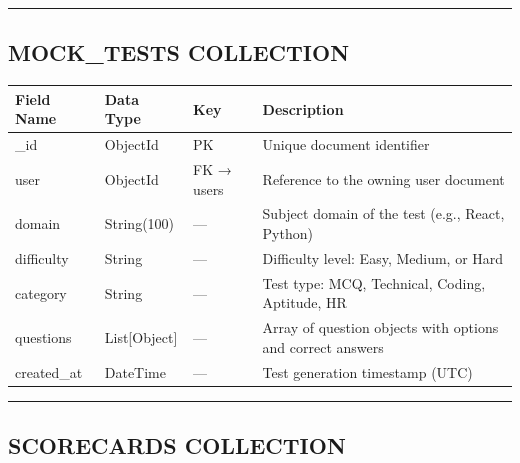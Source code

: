 \documentclass[12pt]{article}
\begin{document}
\noindent\rule{\textwidth}{0.4pt}

\subsection{MOCK\_TESTS COLLECTION}


\begin{longtable}{|p{}|p{}|p{}|p{}|}
\hline
\textbf{Field Name} & \textbf{Data Type} & \textbf{Key} & \textbf{Description} \\ \hline
\endhead
\_id & ObjectId & PK & Unique document identifier \\ \hline
user & ObjectId & FK → users & Reference to the owning user document \\ \hline
domain & String(100) & — & Subject domain of the test (e.g., React, Python) \\ \hline
difficulty & String & — & Difficulty level: Easy, Medium, or Hard \\ \hline
category & String & — & Test type: MCQ, Technical, Coding, Aptitude, HR \\ \hline
questions & List[Object] & — & Array of question objects with options and correct answers \\ \hline
created\_at & DateTime & — & Test generation timestamp (UTC) \\ \hline
\end{longtable}


\noindent\rule{\textwidth}{0.4pt}

\subsection{SCORECARDS COLLECTION}
\end{document}
